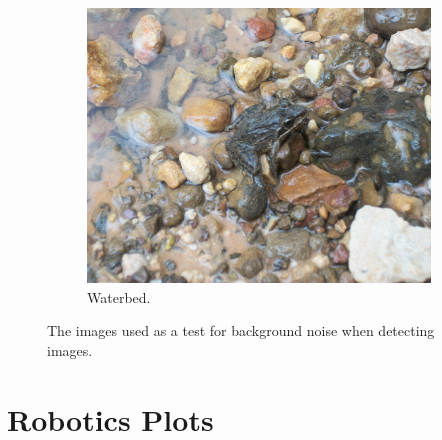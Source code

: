 \begin{figure}
  \begin{subfigure}{0.49\linewidth}    \includegraphics[width=\linewidth]{graphics/texture3} \caption{Waterbed.}         \label{fig:scene_waterb} \end{subfigure}
  \caption{The images used as a test for background noise when detecting images.}
  \label{fig:backgrounds}
\end{figure}

\section{Robotics Plots}
\label{app:roboticsPlots}

